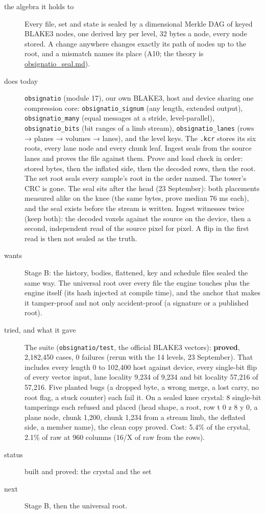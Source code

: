\begin{description}
\item[{the algebra it holds to}] Every file, set and state is sealed by a dimensional Merkle DAG of keyed BLAKE3 nodes, one derived key per level, 32 bytes a node, every node stored. A change anywhere changes exactly its path of nodes up to the root, and a mismatch names its place (A10; the theory is \hyperref[chap:obsignatio-seal]{obsignatio\_\allowbreak{}seal.md}).
\item[{does today}] \texttt{obsignatio} (module 17), our own BLAKE3, host and device sharing one compression core: \texttt{obsignatio\_\allowbreak{}signum} (any length, extended output), \texttt{obsignatio\_\allowbreak{}many} (equal messages at a stride, level-parallel), \texttt{obsignatio\_\allowbreak{}bits} (bit ranges of a limb stream), \texttt{obsignatio\_\allowbreak{}lanes} (rows → planes → volumes → lanes), and the level keys. The \texttt{.\allowbreak{}kcr} stores its six roots, every lane node and every chunk leaf. Ingest seals from the source lanes and proves the file against them. Prove and load check in order: stored bytes, then the inflated side, then the decoded rows, then the root. The set root seals every sample's root in the order named. The tower's CRC is gone. The seal sits after the head (23 September): both placements measured alike on the knee (the same bytes, prove median 76 ms each), and the seal exists before the stream is written. Ingest witnesses twice (keep both): the decoded voxels against the source on the device, then a second, independent read of the source pixel for pixel. A flip in the first read is then not sealed as the truth.
\item[{wants}] Stage B: the history, bodies, flattened, key and schedule files sealed the same way. The universal root over every file the engine touches plus the engine itself (its hash injected at compile time), and the anchor that makes it tamper-proof and not only accident-proof (a signature or a published root).
\item[{tried, and what it gave}] The suite (\texttt{obsignatio/\allowbreak{}test}, the official BLAKE3 vectors): \textbf{proved}, 2,182,450 cases, 0 failures (rerun with the 14 levels, 23 September). That includes every length 0 to 102,400 host against device, every single-bit flip of every vector input, lane locality 9,234 of 9,234 and bit locality 57,216 of 57,216. Five planted bugs (a dropped byte, a wrong merge, a lost carry, no root flag, a stuck counter) each fail it. On a sealed knee crystal: 8 single-bit tamperings each refused and placed (head shape, a root, row t 0 z 8 y 0, a plane node, chunk 1,200, chunk 1,234 from a stream limb, the deflated side, a member name), the clean copy proved. Cost: 5.4\% of the crystal, 2.1\% of raw at 960 columns (16/X of raw from the rows).
\item[{status}] built and proved: the crystal and the set
\item[{next}] Stage B, then the universal root.
\end{description}


